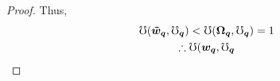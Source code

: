 \documentclass[hidelinks, nonatbib]{elsarticle}
\begin{document}
\begin{lemma}
\begin{proof}
        Thus, 
        \begin{gather}
            \oo(
                \boldsymbol{\tilde{w}_{q}},
                \boldsymbol{\oo_q}
            ) 
            < 
            \oo(
                \boldsymbol{\Omega_{q}},
                \boldsymbol{\oo_q}
            ) 
            = 1
            \\
            \therefore
            \oo(
                \boldsymbol{w_{q}},
                \boldsymbol{\oo_q}

\end{gather}
\end{proof}
\end{lemma}
\end{document}
